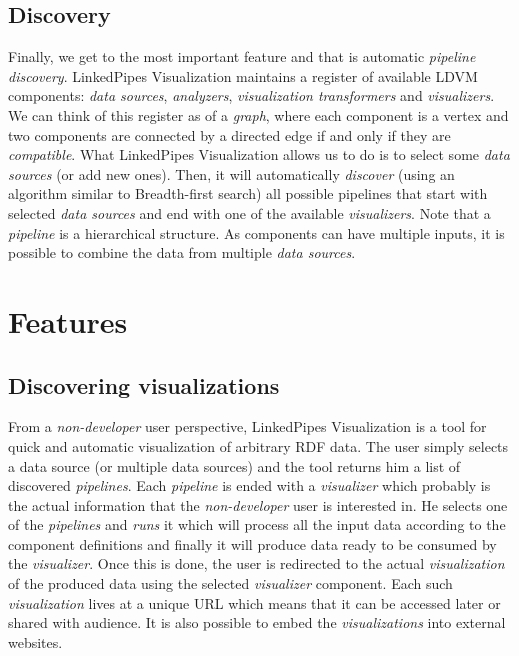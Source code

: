 \subsection{Discovery}

Finally, we get to the most important feature and that is automatic \emph{pipeline discovery}. LinkedPipes Visualization maintains a register of available LDVM components: \emph{data sources}, \emph{analyzers}, \emph{visualization transformers} and \emph{visualizers}. We can think of this register as of a \emph{graph}, where each component is a vertex and two components are connected by a directed edge if and only if they are \emph{compatible}. What LinkedPipes Visualization allows us to do is to select some \emph{data sources} (or add new ones). Then, it will automatically \emph{discover} (using an algorithm similar to Breadth-first search) all possible pipelines that start with selected \emph{data sources} and end with one of the available \emph{visualizers}. Note that a \emph{pipeline} is a hierarchical structure. As components can have multiple inputs, it is possible to combine the data from multiple \emph{data sources}.

\section{Features}

\subsection{Discovering visualizations}

From a \emph{non-developer} user perspective, LinkedPipes Visualization is a tool for quick and automatic visualization of arbitrary RDF data. The user simply selects a data source (or multiple data sources) and the tool returns him a list of discovered \emph{pipelines}. Each \emph{pipeline} is ended with a \emph{visualizer} which probably is the actual information that the \emph{non-developer} user is interested in. He selects one of the \emph{pipelines} and \emph{runs} it which will process all the input data according to the component definitions and finally it will produce data ready to be consumed by the \emph{visualizer}. Once this is done, the user is redirected to the actual \emph{visualization} of the produced data using the selected \emph{visualizer} component. Each such \emph{visualization} lives at a unique URL which means that it can be accessed later or shared with audience. It is also possible to embed the \emph{visualizations} into external websites.

